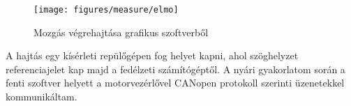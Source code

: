 \begin{figure}[H]
	\centering
	\texttt{[image: figures/measure/elmo]}
	\caption{Mozgás végrehajtása grafikus szoftverből}
	\label{fig:elmo}
\end{figure}

A hajtás egy kísérleti repülőgépen fog helyet kapni, ahol szöghelyzet referenciajelet kap majd a fedélzeti számítógéptől. A nyári gyakorlatom során a fenti szoftver helyett a motorvezérlővel CANopen protokoll szerinti üzenetekkel kommunikáltam.

